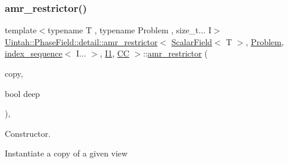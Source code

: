 \subsubsection{\texorpdfstring{amr\+\_\+restrictor()}{amr\_restrictor()}\hspace{0.1cm}{\footnotesize\ttfamily [1/4]}}
{\footnotesize\ttfamily template$<$typename T , typename Problem , size\+\_\+t... I$>$ \\
\hyperlink{classUintah_1_1PhaseField_1_1detail_1_1amr__restrictor}{Uintah\+::\+Phase\+Field\+::detail\+::amr\+\_\+restrictor}$<$ \hyperlink{structUintah_1_1PhaseField_1_1ScalarField}{Scalar\+Field}$<$ T $>$, \hyperlink{classUintah_1_1PhaseField_1_1Problem}{Problem}, \hyperlink{namespaceUintah_1_1PhaseField_a237de804d99512e50613aff7c94a9461}{index\+\_\+sequence}$<$ I... $>$, \hyperlink{namespaceUintah_1_1PhaseField_a547ce3002aa97fbd3ef3192a6eec8406a66f19efe774b0d2b6e5844eb2d83d305}{I1}, \hyperlink{namespaceUintah_1_1PhaseField_a33d355affda78a83f45755ba8388cedda22303704507d024d1d6508ed9859a85a}{CC} $>$\+::\hyperlink{classUintah_1_1PhaseField_1_1detail_1_1amr__restrictor}{amr\+\_\+restrictor} (\begin{DoxyParamCaption}\item[{const \hyperlink{classUintah_1_1PhaseField_1_1detail_1_1amr__restrictor}{amr\+\_\+restrictor}$<$ \hyperlink{structUintah_1_1PhaseField_1_1ScalarField}{Scalar\+Field}$<$ T $>$, \hyperlink{classUintah_1_1PhaseField_1_1Problem}{Problem}, \hyperlink{namespaceUintah_1_1PhaseField_a237de804d99512e50613aff7c94a9461}{index\+\_\+sequence}$<$ I... $>$, \hyperlink{namespaceUintah_1_1PhaseField_a547ce3002aa97fbd3ef3192a6eec8406a66f19efe774b0d2b6e5844eb2d83d305}{I1}, \hyperlink{namespaceUintah_1_1PhaseField_a33d355affda78a83f45755ba8388cedda22303704507d024d1d6508ed9859a85a}{CC} $>$ $\ast$}]{copy,  }\item[{bool}]{deep }\end{DoxyParamCaption})\hspace{0.3cm}{\ttfamily [inline]}, {\ttfamily [protected]}}



Constructor. 

Instantiate a copy of a given view


